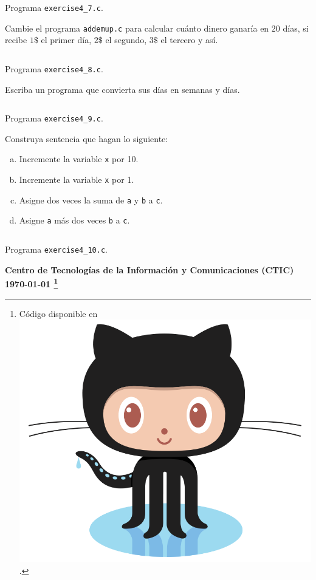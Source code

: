 \documentclass[spanish,addpoints,answers,a4paper]{exam}
\newcommand{\unmarkedfntext}[1]{%
	\begingroup
	\renewcommand\thefootnote{}\footnote{#1}%
	\addtocounter{footnote}{-1}%
	\endgroup
}
\newcommand{\mychar}{%
	\begingroup\normalfont
	\includegraphics[height=\fontcharht\font`\B]{Octocat.png}%
	\endgroup
}
\begin{document}
\begin{questions}
\begin{solution}
\begin{listing}[H]
	\footnotesize
	\inputminted{c}{exercise4_7.c}
	\caption{Programa \texttt{exercise4\_7.c}.}
	\label{lst:4.7}
\end{listing}
\end{solution}

\question Cambie el programa \texttt{addemup.c} para calcular cuánto dinero ganaría en $20$ días, si recibe $1\$$ el primer día, $2\$$ el segundo, $3\$$ el tercero y así.

\begin{solution}

\begin{listing}[H]
	\footnotesize
	\inputminted{c}{exercise4_8.c}
	\caption{Programa \texttt{exercise4\_8.c}.}
	\label{lst:4.8}
\end{listing}
\end{solution}

\question Escriba un programa que convierta sus días en semanas y días.

\begin{solution}
	
\begin{listing}[H]
	\footnotesize
	\inputminted{c}{exercise4_9.c}
	\caption{Programa \texttt{exercise4\_9.c}.}
	\label{lst:4.9}
\end{listing}
\end{solution}

\question Construya sentencia que hagan lo siguiente:

\begin{enumerate}[a.]
	\item Incremente la variable \texttt{x} por 10.
	\item Incremente la variable \texttt{x} por 1.
	\item Asigne dos veces la suma de \texttt{a} y \texttt{b} a \texttt{c}.
	\item Asigne \texttt{a} más dos veces \texttt{b} a \texttt{c}.
\end{enumerate}

\begin{solution}
	
\begin{listing}[H]
	\footnotesize
	\inputminted{c}{exercise4_10.c}
	\caption{Programa \texttt{exercise4\_10.c}.}
	\label{lst:4.10}
\end{listing}
\end{solution}

\end{questions}

\begin{flushright}\bfseries
Centro de Tecnologías de la Información y Comunicaciones (CTIC)\\[2mm]
\today\unmarkedfntext{Código disponible en \href{https://github.com/carlosal1015/C-Programming}{\mychar{}}.}
\end{flushright}
\end{document}
